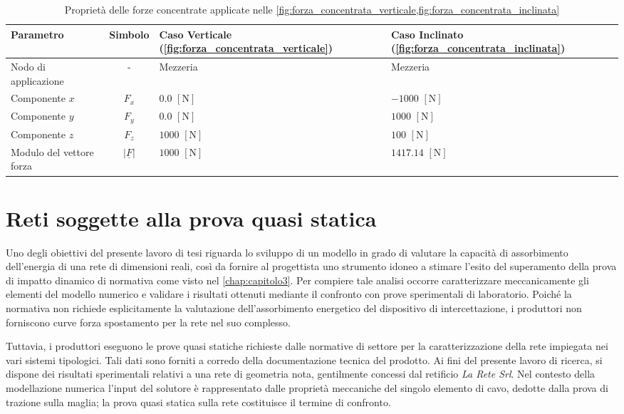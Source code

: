 \begin{table}[htbp]
    \centering
    \caption{Proprietà delle forze concentrate applicate nelle \cref{fig:forza_concentrata_verticale,fig:forza_concentrata_inclinata}}
    \vspace{5pt}
    \label{tab:caratteristiche_forze_concentrate}
    \begin{tabularx}{\textwidth}{l c X X}
        \hline
        \textbf{Parametro} & \textbf{Simbolo} & \textbf{Caso Verticale} \small{(\cref{fig:forza_concentrata_verticale})} & \textbf{Caso Inclinato} \small{(\cref{fig:forza_concentrata_inclinata})} \\ \hline
        Nodo di applicazione & - & Mezzeria  & Mezzeria  \\
        Componente $x$ & $F_x$ & $0.0$ $[\text{N}]$ & $-1000$ $[\text{N}]$ \\
        Componente $y$ & $F_y$ & $0.0$ $[\text{N}]$ & $1000$ $[\text{N}]$  \\
        Componente $z$ & $F_z$ & $1000$ $[\text{N}]$ & $100$ $[\text{N}]$ \\
        Modulo del vettore forza & $|\underline{F}|$ & $1000$ $[\text{N}]$ & $1417.14$ $[\text{N}]$ \\ \hline
    \end{tabularx}
\end{table}

\section{Reti soggette alla prova quasi statica}

Uno degli obiettivi del presente lavoro di tesi riguarda lo sviluppo di un modello in grado di valutare la capacità di assorbimento dell'energia di una rete di dimensioni reali, così da fornire al progettista uno strumento idoneo a stimare l'esito del superamento della prova di impatto dinamico di normativa come visto nel \cref{chap:capitolo3}. Per compiere tale analisi occorre caratterizzare meccanicamente gli elementi del modello numerico e validare i risultati ottenuti mediante il confronto con prove sperimentali di laboratorio. Poiché la normativa non richiede esplicitamente la valutazione dell'assorbimento energetico del dispositivo di intercettazione, i produttori non forniscono curve forza spostamento per la rete nel suo complesso.

Tuttavia, i produttori eseguono le prove quasi statiche richieste dalle normative di settore per la caratterizzazione della rete impiegata nei vari sistemi tipologici. Tali dati sono forniti a corredo della documentazione tecnica del prodotto. Ai fini del presente lavoro di ricerca, si dispone dei risultati sperimentali relativi a una rete di geometria nota, gentilmente concessi dal retificio \textit{La Rete Srl}. Nel contesto della modellazione numerica l'input del solutore è rappresentato dalle proprietà meccaniche del singolo elemento di cavo, dedotte dalla prova di trazione sulla maglia; la prova quasi statica sulla rete costituisce il termine di confronto. 


